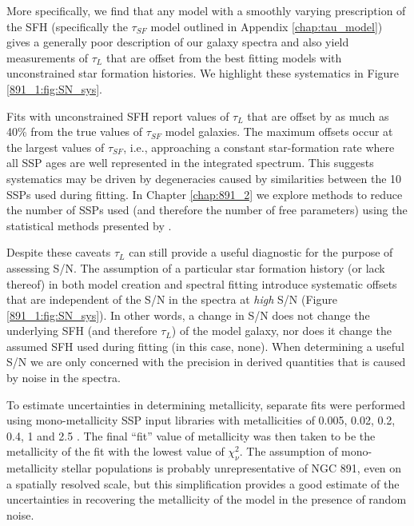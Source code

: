 More specifically, we find that any model with a smoothly varying
prescription of the SFH (specifically the $\tau_{SF}$ model outlined
in Appendix \ref{chap:tau_model}) gives a generally poor description
of our galaxy spectra and also yield measurements of $\tau_L$ that are
offset from the best fitting models with unconstrained star formation
histories. We highlight these systematics in Figure
\ref{891_1:fig:SN_sys}.

Fits with unconstrained SFH report values of $\tau_L$ that are offset
by as much as 40\% from the true values of $\tau_{SF}$ model
galaxies. The maximum offsets occur at the largest values of
$\tau_{SF}$, i.e., approaching a constant star-formation rate where
all SSP ages are well represented in the integrated spectrum.  This
suggests systematics may be driven by degeneracies caused by
similarities between the 10 SSPs used during fitting.  In Chapter
\ref{chap:891_2} we explore methods to reduce the number of SSPs used
(and therefore the number of free parameters) using the statistical
methods presented by \citet{Mosby15}.

%
Despite these caveats $\tau_L$ can still provide a useful diagnostic
for the purpose of assessing S/N. The assumption of a particular star
formation history (or lack thereof) in both model creation and
spectral fitting introduce systematic offsets that are independent of
the S/N in the spectra at {\it high} S/N (Figure \ref{891_1:fig:SN_sys}). In
other words, a change in S/N does not change the underlying SFH (and
therefore $\tau_L$) of the model galaxy, nor does it change the
assumed SFH used during fitting (in this case, none). When determining
a useful S/N we are only concerned with the precision in derived
quantities that is caused by noise in the spectra.

To estimate uncertainties in determining metallicity, separate fits
were performed using mono-metallicity SSP input libraries with
metallicities of 0.005, 0.02, 0.2, 0.4, 1 and 2.5 \Zsol.  The final
``fit'' value of metallicity was then taken to be the metallicity of
the fit with the lowest value of $\chi^2_\nu$. The assumption of
mono-metallicity stellar populations is probably unrepresentative of
NGC 891, even on a spatially resolved scale, but this simplification
provides a good estimate of the uncertainties in recovering the
metallicity of the model in the presence of random noise.

